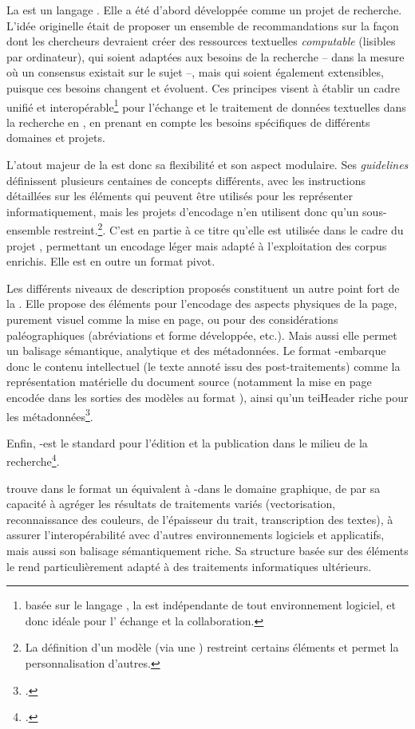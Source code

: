 La \tei est un langage \xml. Elle a été d’abord développée comme un projet de recherche. L’idée originelle était de proposer un ensemble de recommandations sur la façon dont les chercheurs devraient créer des ressources textuelles \textit{computable} (lisibles par ordinateur), qui soient adaptées aux besoins de la recherche – dans la mesure où un consensus existait sur le sujet –, mais qui soient également extensibles, puisque ces besoins changent et évoluent. Ces principes visent à établir un cadre unifié et interopérable\footnote{basée sur le langage \xml, la \tei est indépendante de tout environnement logiciel, et donc idéale pour l’ échange et la collaboration.} pour l'échange et le traitement de données textuelles dans la recherche en \shs, en prenant en compte les besoins spécifiques de différents domaines et projets.

L'atout majeur de la \tei est donc sa flexibilité et son aspect modulaire. Ses \textit{guidelines} définissent plusieurs centaines de concepts différents, avec les instructions détaillées sur les éléments qui peuvent être utilisés pour les représenter informatiquement, mais les projets d’encodage n'en utilisent donc qu'un sous-ensemble restreint.\footnote{La définition d'un
  modèle \tei (via une \odd) restreint certains éléments et permet la
  personnalisation d'autres.}. C'est en partie à ce titre qu'elle est utilisée dans le cadre du projet \gaga, permettant un encodage léger mais adapté à l'exploitation des corpus enrichis. Elle est en outre un format pivot. 

Les différents niveaux de description proposés constituent un autre point fort de la \tei. Elle propose des éléments pour l'encodage des aspects physiques de la page, purement visuel comme la mise en page, ou pour des considérations paléographiques (abréviations et forme développée, etc.). Mais aussi elle permet un balisage sémantique, analytique et des métadonnées. Le format \xml-\tei embarque donc le contenu intellectuel (le texte annoté issu des post-traitements) comme la représentation matérielle du document source (notamment la mise en page encodée dans les sorties des modèles \htr au format \alto), ainsi qu'un teiHeader riche pour les métadonnées\footcite{gabay_gallicorpor_2022}.

Enfin, \xml-\tei est le standard pour l'édition et la publication dans le milieu de la recherche\footcite{gabay_gallicorpor_2022}. 

\eida trouve dans le format \svg un équivalent à \xml-\tei dans le domaine graphique, de par sa capacité à agréger les résultats de traitements variés (vectorisation, reconnaissance des couleurs, de l'épaisseur du trait, transcription des textes), à assurer l'interopérabilité avec d'autres environnements logiciels et applicatifs, mais aussi son balisage sémantiquement riche. Sa structure basée sur des éléments \xml le rend particulièrement adapté à des traitements informatiques ultérieurs. 

